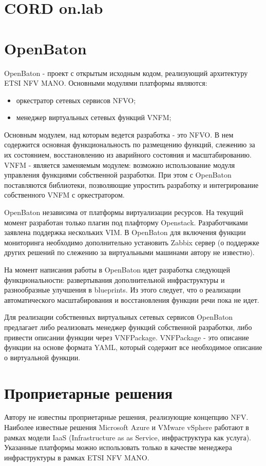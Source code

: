 \documentclass[oneside,final,14pt,a4paper]{extreport}
\begin{document}
\section{CORD on.lab}


\section{OpenBaton}
OpenBaton - проект с открытым исходным кодом, реализующий архитектуру ETSI NFV MANO. Основными модулями платформы являются:
\begin{itemize}
	\item оркестратор сетевых сервисов NFVO;
	\item менеджер виртуальных сетевых функций VNFM;
\end{itemize}

Основным модулем, над которым ведется разработка - это NFVO. В нем содержится основная функциональность по размещению функций, слежению за их состоянием, восстановлению из аварийного состояния и масштабированию. VNFM - является заменяемым модулем: возможно использование модуля управления функциями собственной разработки. При этом с OpenBaton поставляются библиотеки, позволяющие упростить разработку и интегрирование собственного VNFM с оркестратором.

OpenBaton независима от платформы виртуализации ресурсов. На текущий момент разработан только плагин под плафторму Openstack. Разработчиками заявлена поддержка нескольких VIM. В OpenBaton для включения функции мониторинга необходимо дополнительно установить Zabbix сервер (о поддержке других решений по слежению за виртуальными машинами автору не известно).

На момент написания работы в OpenBaton идет разработка следующей функциональности: развертывания дополнительной инфраструктуры и разнообразные улучшения в blueprints. Из этого следует, что о реализации автоматического масштабирования и восстановления функции речи пока не идет.

Для реализации собственных виртуальных сетевых сервисов OpenBaton предлагает либо реализовать менеджер функций собственной разработки, либо привести описании функции через VNFPackage. VNFPackage - это описание функции на основе формата YAML, который содержит все необходимое описание о виртуальной функции.


\section{Проприетарные решения}
	Автору не известны проприетарные решения, реализующие концепцию NFV. Наиболее известные решения Microsoft Azure и VMware vSphere работают в рамках модели IaaS (Infrastructure as as Service, инфраструктура как услуга). Указанные платформы можно использовать только в качестве менеджера инфраструктуры в рамках ETSI NFV MANO.
\end{document}

